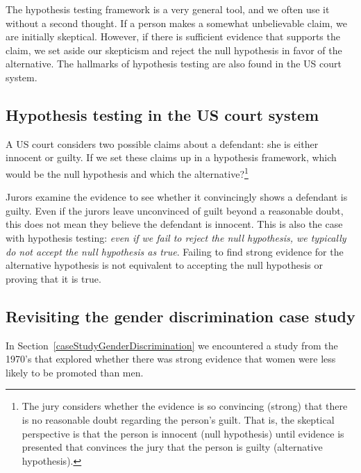 The hypothesis testing framework is a very general tool, and we often use it without a second thought. If a person makes a somewhat unbelievable claim, we are initially skeptical. However, if there is sufficient evidence that supports the claim, we set aside our skepticism and reject the null hypothesis in favor of the alternative. The hallmarks of hypothesis testing are also found in the US court system. 

\subsection{Hypothesis testing in the US court system}

\begin{exercise} \label{hypTestCourtExample}
A US court considers two possible claims about a defendant: she is either innocent or guilty. If we set these claims up in a hypothesis framework, which would be the null hypothesis and which the alternative?\footnote{The jury considers whether the evidence is so convincing (strong) that there is no reasonable doubt regarding the person's guilt. That is, the skeptical perspective is that the person is innocent (null hypothesis) until evidence is presented that convinces the jury that the person is guilty (alternative hypothesis).}
\end{exercise}

Jurors examine the evidence to see whether it convincingly shows a defendant is guilty. Even if the jurors leave unconvinced of guilt beyond a reasonable doubt, this does not mean they believe the defendant is innocent. This is also the case with hypothesis testing: \emph{even if we fail to reject the null hypothesis, we typically do not accept the null hypothesis as true}. Failing to find strong evidence for the alternative hypothesis is not equivalent to accepting the null hypothesis or proving that it is true.


\subsection{Revisiting the gender discrimination case study}

In Section~\ref{caseStudyGenderDiscrimination} we encountered a study from the 1970's that explored whether there was strong evidence that women were less likely to be promoted than men.


